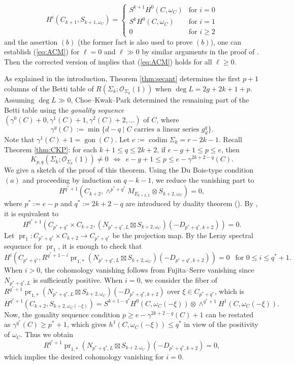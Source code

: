 \documentclass[graybox]{svmult}
\newcommand{\sO}{\mathscr{O}}
\def\codim{\operatorname{codim}}
\DeclareMathOperator{\pr}{pr}
\DeclareMathOperator{\gon}{gon}
\begin{document}
$$
H^i(C_{k+1}, S_{k+1, \omega_C})=\begin{cases} S^{k+1} H^0(C, \omega_C) & \text{for $i=0$} \\ S^k H^0(C, \omega_C) & \text{for $i=1$} \\ 0 & \text{for $i \geq 2$} \end{cases}
$$
and the assertion $(b)$ (the former fact is also used to prove $(b)$), one can establish (\ref{eq:ACM}) for $\ell=0$ and $\ell \gg 0$ by similar arguments in the proof of \cite[Theorem 5.8]{ENP2}. Then the corrected version of \cite[Theorem 10.42]{Kollar} implies that (\ref{eq:ACM}) holds for all $\ell \geq 0$.

As explained in the introduction, Theorem \ref{thm:secant} determines the first $p+1$ columns of the Betti table of $R(\Sigma_k; \sO_{\Sigma_k}(1))$ when $\deg L = 2g+2k+1+p$. Assuming $\deg L \gg 0$, Choe--Kwak--Park \cite{CKP} determined the remaining part of the Betti table using the \emph{gonality sequence} $(\gamma^0(C)+0, \gamma^1(C)+1, \gamma^2(C)+2, \ldots)$ of $C$, where
$$
\gamma^q(C):=\min\{d -q \mid \text{$C$ carries a linear series $g_d^q$} \}.
$$
Note that $\gamma^1(C)+1=\gon(C)$.
 Let $e:=\codim \Sigma_k=r-2k-1$. Recall Theorem \ref{thm:CKP}: for each $k+1 \leq q \leq 2k+2$, if $e-g+1 \leq p \leq e$, then 
$$
K_{p,q}(\Sigma_k; \sO_{\Sigma_k}(1)) \neq 0~~\Longleftrightarrow~~e - g+1 \leq p \leq e - \gamma^{2k+2-q}(C).
$$
We give a sketch of the proof of this theorem. Using the Du Bois-type condition $(a)$ and proceeding by induction on $q-k-1$, we reduce the vanishing part to
$$
H^{q^*+1}(C_{k+2}, \wedge^{p^*+q^*} M_{E_{k+2, L}} \otimes S_{k+2, \omega_C})=0,
$$
where $p^*:=e-p$ and $q^*:=2k+2-q$ are introduced by duality theorem (\cite[Theorem 2.c.1]{Green1}).
By \cite[Lemma 3.3]{CKP}, it is equivalent to
$$
H^{q^*+1}(C_{p^*+q^*} \times C_{k+2}, (N_{p^*+q^*,L} \boxtimes S_{k+2, \omega_C})(-D_{p^*+q^*, k+2})) = 0.
$$
Let $\pr_1 \colon C_{p^*+q^*} \times C_{k+2} \to C_{p^*+q^*}$ be the projection map. By the Leray spectral sequence for $\pr_1$, it is enough to check that
$$
H^i(C_{p^*+q^*}, R^{q^*+1-i} \pr_{1,*} (N_{p^*+q^*,L} \boxtimes S_{k+2, \omega_C})(-D_{p^*+q^*, k+2})) =0~~
\text{ for $0 \leq i \leq q^*+1$}.
$$
When $i>0$, the cohomology vanishing follows from Fujita--Serre vanishing since $N_{p^*+q^*, L}$ is sufficiently positive. When $i=0$, we consider the fiber of $R^{q^*+1} \pr_{1,*} (N_{p^*+q^*,L} \boxtimes S_{k+2, \omega_C})(-D_{p^*+q^*,k+2})$ over $\xi \in C_{p^*+q^*}$, which is 
$$
H^{q^*+1}(C_{k+2}, S_{k+2, \omega_C(-\xi)}) = S^{k+1-q^*} H^0(C, \omega_C(-\xi)) \otimes \wedge^{q^*+1} H^1(C, \omega_C(-\xi)).
$$
Now, the gonality sequence condition $p \geq e-\gamma^{2k+2-q}(C)+1$ can be restated as $\gamma^{q^*}(C) \geq p^*+1$, which gives $h^1(C, \omega_C(-\xi)) \leq q^*$ in view of the positivity of $\omega_C$. Thus we obtain
$$
R^{q^*+1} \pr_{1,*} (N_{p^*+q^*,L} \boxtimes S_{k+2, \omega_C})(-D_{p^*+q^*,k+2}) = 0,
$$
which implies the desired cohomology vanishing for $i=0$. 
\end{document}
